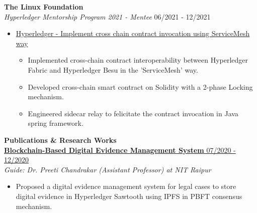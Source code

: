 \documentclass{article}
\begin{document}
\noindent \normalsize \textbf{The Linux Foundation} \\
\textit{Hyperledger Mentorship Program 2021 - Mentee} \hfill 06/2021 - 12/2021
\begin{itemize}[noitemsep,nolistsep,leftmargin=*]
    \item {\normalsize \href{https://wiki.hyperledger.org/display/INTERN/Implement+cross+chain+contract+invocation+using+ServiceMesh+way}{Hyperledger - Implement cross chain contract invocation using ServiceMesh way}
        \begin{itemize}
            \item Implemented cross-chain contract interoperability between Hyperledger Fabric and Hyperledger Besu in the 'ServiceMesh' way.
            \item Developed cross-chain smart contract on Solidity with a 2-phase Locking mechanism.
            \item Engineered sidecar relay to felicitate the contract invocation in Java spring framework.
        \end{itemize}
    }
\end{itemize}

\noindent \large \textbf{\textcolor{NavyBlue}{Publications \& Research Works}} \vspace{3pt} \\
\noindent \normalsize \href{https://link.springer.com/content/pdf/10.1007/978-3-030-82469-3_30}{\textbf{Blockchain-Based Digital Evidence Management System } \hfill 07/2020 - 12/2020} \\
\textit{Guide: Dr. Preeti Chandrakar (Assistant Professor) at NIT Raipur} \hfill
\begin{itemize}
    \item Proposed a digital evidence management system for legal cases to store digital evidence in Hyperledger Sawtooth using IPFS in PBFT consensus mechanism.
\end{itemize}
\end{document}
